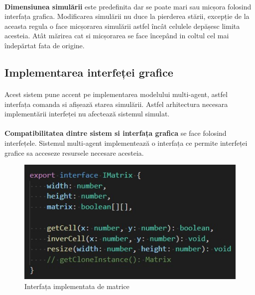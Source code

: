 \documentclass[11pt ,A4]{article}
\begin{document}
            \paragraph{}
                \textbf{Dimensiunea simulării} este predefinita dar se poate mari sau micșora folosind interfața grafica.
                Modificarea simulării nu duce la pierderea stării, excepție de la aceasta regula o face micșorarea simulării astfel încât celulele depășesc limita acesteia.
                Atât mărirea cat si micșorarea se face începând in coltul cel mai îndepărtat fata de origine.

        \subsection{Implementarea interfeței grafice}
            \paragraph{}
                Acest sistem pune accent pe implementarea modelului multi-agent, astfel interfața comanda si afișează starea simulării.
                Astfel arhitectura necesara implementării interfeței nu afectează sistemul simulat.

            \paragraph{}
                \textbf{Compatibilitatea dintre sistem si interfața grafica} se face folosind interfețele.
                Sistemul multi-agent implementează o interfața ce permite interfeței grafice sa acceseze resursele necesare acesteia.
                \begin{figure}[H]
                    \centering
                    \includegraphics[scale=0.8]{IMatrix_interface}
                    \caption{Interfața implementata de matrice}
                \end{figure}
\end{document}
